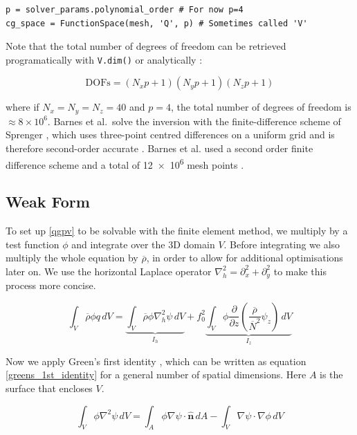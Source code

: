 \documentclass{article}
\begin{document}
\begin{verbatim}
p = solver_params.polynomial_order # For now p=4
cg_space = FunctionSpace(mesh, 'Q', p) # Sometimes called 'V'
\end{verbatim}

Note that the total number of degrees of freedom can be retrieved programatically with \texttt{V.dim()} \cite{FiredrakeUserManual} or analytically \cite{Homolya2017}:

\begin{equation}\label{degrees_of_freedom}
    \text{DOFs} = (N_x p+1)(N_y p +1 )(N_z p + 1)
\end{equation}

where if $N_x = N_y=N_z=40$ and $p=4$, the total number of degrees of freedom is $\approx 8 \times 10^6$.
Barnes et al.\ solve the inversion with the finite-difference scheme of Sprenger \cite{sprenger2007userguide}, which uses three-point centred differences on a uniform grid \cite{Barnes2022main} and is therefore second-order accurate \cite{LeVeque2007}.
Barnes et al. used a second order finite difference scheme and a total of \num{12e6} mesh points \cite{Barnes2022main}.

\subsection{Weak Form}
To set up \cref{qgpv} to be solvable with the finite element method, we multiply by a test function $\phi$ and integrate over the 3D domain $V$.
Before integrating we also multiply the whole equation by $\overline\rho$, in order to allow for additional optimisations later on.
We use the horizontal Laplace operator $\nabla^2_h=\partial^2_x+\partial^2_y$ to make this process more concise.

\begin{equation}\label{weak_form_1}
    \int_V { \overline\rho \phi q  \,dV} = \underbrace{\int_V {\overline\rho \phi \nabla_h^2 \psi  \,dV}}_{I_h} + f_0^2 \underbrace{\int_V { \phi\frac{\partial}{\partial z} \left( \frac{\overline \rho}{\overline N^2} \psi _z \right) \,dV}}_{I_z}
\end{equation}

Now we apply Green's first identity \cite{kellogg2026foundations}, which can be written as equation \eqref{greens_1st_identity} for a general number of spatial dimensions.
Here $A$ is the surface that encloses $V$.

\begin{equation}\label{greens_1st_identity}
    \int_V {\phi \nabla^2 \psi \,dV} = \int_A {\phi \nabla \psi \cdot \bm {\hat {n}} \,dA} - \int_V {\nabla \psi \cdot \nabla \phi \,dV}
\end{equation}
\end{document}
